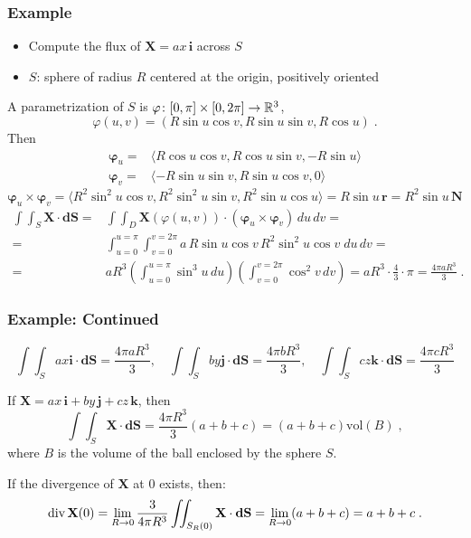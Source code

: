 \begin{frame}
  \frametitle{Example}

\begin{itemize}
  \item Compute the flux of  $\textbf{X} = ax\, \textbf{i}$ across $S$
  \item $S$: sphere of radius $R$ centered at the origin, positively oriented
\end{itemize}

\pause A parametrization of $S$ is $\varphi \colon [0,\pi] \times [0,2\pi]\to {\mathbb{R}}^3$,
%
$$\varphi(u,v) = (R\sin{u}\cos{v}, R\sin{u}\sin{v}, R\cos{u}) \; .$$
%
\pause Then
%
\begin{align*}
  \bm{\varphi}_u =& \langle R\cos{u}\cos{v}, R\cos{u}\sin{v}, -R\sin{u}\rangle \\
  \bm{\varphi}_v = & \langle -R\sin{u}\sin{v}, R\sin{u}\cos{v}, 0 \rangle
\end{align*}
%
$$\bm{\varphi}_u \times \bm{\varphi}_v = \langle R^2\sin^2{u}\cos{v}, R^2\sin^2{u}\sin{v}, R^2\sin{u}\cos{u} \rangle = R\sin{u} \, \textbf{r} = R^2\sin{u}\, \textbf{N}$$
%
\begin{align*}
  \int\!\!\!\int_S \textbf{X} \cdot \textbf{dS}= & \int\!\!\!\int_D \textbf{X}(\varphi(u,v)) \cdot (\bm{\varphi}_u \times \bm{\varphi}_v) \, du\, dv = \\
  = & \int_{u=0}^{u=\pi} \int_{v=0}^{v=2\pi} a\, R\sin{u}\cos{v}\, R^2\sin^2{u}\cos{v}\; du\, dv = \\
  = & aR^3 \left( \int_{u=0}^{u=\pi} \sin^3{u} \, du \right) \left( \int_{v=0}^{v=2\pi} \cos^2{v}\, dv \right) = aR^3 \cdot \frac{4}{3} \cdot \pi = \frac{4\pi aR^3}{3}\; .
\end{align*}
\end{frame}

\begin{frame}
\frametitle{Example: Continued}

$$\int\!\!\!\int_S ax\textbf{i} \cdot \textbf{dS}= \frac{4\pi aR^3}{3} ,\quad
\int\!\!\!\int_S by\textbf{j} \cdot \textbf{dS}= \frac{4\pi bR^3}{3},\quad
\int\!\!\!\int_S cz\textbf{k} \cdot \textbf{dS}= \frac{4\pi cR^3}{3}
 $$

\pause If $\textbf{X} = ax\, \textbf{i} + by\, \textbf{j} + cz\, \textbf{k}$, then
%
$$\int\!\!\!\int_S \textbf{X} \cdot \textbf{dS} = \frac{4\pi R^3}{3} (a+b+c) = (a+b+c) \text{vol}(B)\; ,$$
%
where $B$ is the volume of the ball enclosed by the sphere $S$.
\medskip

\pause If the divergence of $\textbf{X}$ at 0 exists, then:
%
$$\operatorname{div} \textbf{X} (0) = \lim_{R\to 0} \frac{3}{4\pi R^3} \int\!\!\!\int_{S_R(0)} \textbf{X} \cdot \textbf{dS} = \lim_{R \to 0} (a+b+c) = a+b+c\; .$$
\end{frame}

